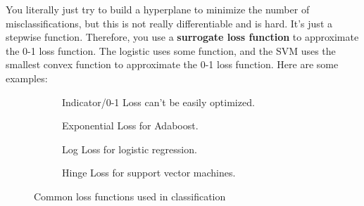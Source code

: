 You literally just try to build a hyperplane to minimize the number of misclassifications, but this is not really differentiable and is hard. It's just a stepwise function. Therefore, you use a \textbf{surrogate loss function} to approximate the 0-1 loss function. The logistic uses some function, and the SVM uses the smallest convex function to approximate the 0-1 loss function. Here are some examples: 

\begin{figure}[H]
  \centering
  \begin{subfigure}[b]{0.48\textwidth}
    \centering
    \caption{Indicator/0-1 Loss can't be easily optimized.}
    \label{fig:indicator}
  \end{subfigure}
  \begin{subfigure}[b]{0.48\textwidth}
    \centering
    \caption{Exponential Loss for Adaboost.}
    \label{fig:exponential}
  \end{subfigure}
  
  \begin{subfigure}[b]{0.48\textwidth}
    \centering
    \caption{Log Loss for logistic regression. }
    \label{fig:logistic}
  \end{subfigure}
  \begin{subfigure}[b]{0.48\textwidth}
    \centering
    \caption{Hinge Loss for support vector machines.}
    \label{fig:hinge}
  \end{subfigure}
  \caption{Common loss functions used in classification}
  \label{fig:loss_functions}
\end{figure}

